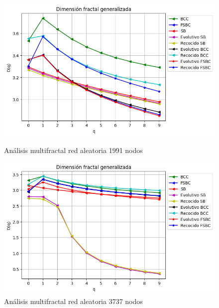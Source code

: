 \begin{figure}[!htb]
    \begin{minipage}{0.48\textwidth}
        \centering
        \includegraphics[scale=0.5]{CapituloAAnexos/imagenesAnexoC/Fractalidad/grafica_Dq20180502_133953Random1991Nodes5939.png}
        \caption{Análisis multifractal red aleatoria 1991 nodos}
    \end{minipage}\hfill
   \begin{minipage}{0.48\textwidth}
         \centering
        \includegraphics[scale=0.5]{CapituloAAnexos/imagenesAnexoC/Fractalidad/grafica_Dq20180508_231031Random3373Nodes5978.png}
    \caption{Análisis multifractal red aleatoria 3737 nodos}
    \end{minipage}
\end{figure}



